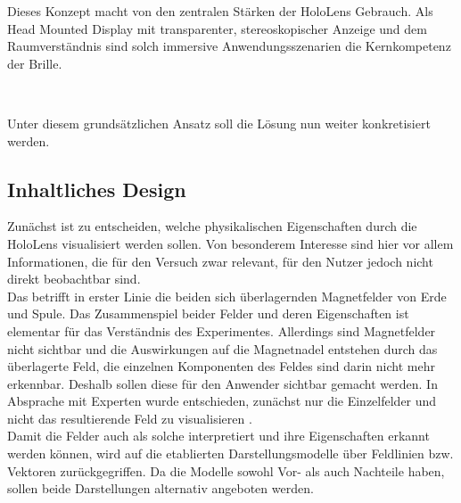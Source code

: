 Dieses Konzept macht von den zentralen Stärken der HoloLens Gebrauch. Als Head Mounted Display mit transparenter, stereoskopischer Anzeige und dem Raumverständnis sind solch immersive Anwendungsszenarien die Kernkompetenz der Brille. 

\vspace{8px}
\begin{center}
	\\
\end{center}
\vspace{6px}


Unter diesem grundsätzlichen Ansatz soll die Lösung nun weiter konkretisiert werden.


\subsection{Inhaltliches Design} %
\label{sec-4-2}
Zunächst ist zu entscheiden, welche physikalischen Eigenschaften durch die HoloLens visualisiert werden sollen. Von besonderem Interesse sind hier vor allem Informationen, die für den Versuch zwar relevant, für den Nutzer jedoch nicht direkt beobachtbar sind.\\

Das betrifft in erster Linie die beiden sich überlagernden Magnetfelder von Erde und Spule. Das Zusammenspiel beider Felder und deren Eigenschaften ist elementar für das Verständnis des Experimentes. Allerdings sind Magnetfelder nicht sichtbar und die Auswirkungen auf die Magnetnadel entstehen durch das überlagerte Feld, die einzelnen Komponenten des Feldes sind darin nicht mehr erkennbar. Deshalb sollen diese für den Anwender sichtbar gemacht werden. In Absprache mit Experten wurde entschieden, zunächst nur die Einzelfelder und nicht das resultierende Feld zu visualisieren \autocite{Reinholz18}.\\
\noindent\hspace*{5mm}
Damit die Felder auch als solche interpretiert und ihre Eigenschaften erkannt werden können, wird auf die etablierten Darstellungsmodelle über Feldlinien bzw. Vektoren zurückgegriffen. Da die Modelle sowohl Vor- als auch Nachteile haben, sollen beide Darstellungen alternativ angeboten werden.\\

